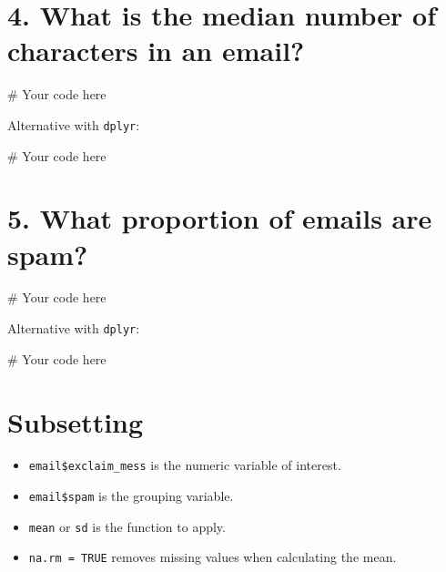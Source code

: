 \documentclass[
  letterpaper,
  DIV=11,
  numbers=noendperiod]{scrreprt}
\newenvironment{Shaded}{\begin{snugshade}}{\end{snugshade}}
\newcommand{\CommentTok}[1]{\textcolor[rgb]{0.37,0.37,0.37}{#1}}
\begin{document}
\section{4. What is the median number of characters in an
email?}\label{what-is-the-median-number-of-characters-in-an-email}

\begin{Shaded}
\begin{Highlighting}[]
\CommentTok{\# Your code here}
\end{Highlighting}
\end{Shaded}

Alternative with \texttt{dplyr}:

\begin{Shaded}
\begin{Highlighting}[]
\CommentTok{\# Your code here}
\end{Highlighting}
\end{Shaded}

\section{5. What proportion of emails are
spam?}\label{what-proportion-of-emails-are-spam}

\begin{Shaded}
\begin{Highlighting}[]
\CommentTok{\# Your code here}
\end{Highlighting}
\end{Shaded}

Alternative with \texttt{dplyr}:

\begin{Shaded}
\begin{Highlighting}[]
\CommentTok{\# Your code here}
\end{Highlighting}
\end{Shaded}

\section{Subsetting}\label{subsetting}

\begin{itemize}
\item
  \texttt{email\$exclaim\_mess} is the numeric variable of interest.
\item
  \texttt{email\$spam} is the grouping variable.
\item
  \texttt{mean} or \texttt{sd} is the function to apply.
\item
  \texttt{na.rm\ =\ TRUE} removes missing values when calculating the
  mean.
\end{itemize}
\end{document}

